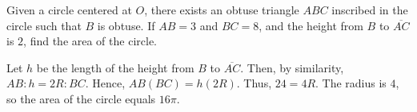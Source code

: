 \begin{problem}
Given a circle centered at $O$, there exists an obtuse triangle $ABC$ inscribed in the circle such that $B$ is obtuse. If $AB=3$ and $BC=8$, and the height from $B$ to $\overline{AC}$ is $2$, find the area of the circle.
\end{problem}

\begin{solution}
Let $h$ be the length of the height from $B$ to $\overline{AC}$. Then, by similarity, $AB:h=2R:BC$. Hence, $AB(BC)=h(2R)$. Thus, $24=4R$. The radius is $4$, so the area of the circle equals $16\pi$.
\end{solution}

